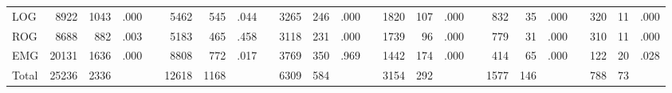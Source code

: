 \begin{SidewaysTable}
{\begin{tabular}{lrrrlrrrlrrrlrrrlrrrlrrr}
LOG   & 8922      & 1043    & .000    &  & 5462     & 545     & .044    &  & 3265     & 246    & .000    &  & 1820    & 107    & .000    &  & 832     & 35     & .000   &  & 320     & 11    & .000    \\
ROG   & 8688      & 882     & .003    &  & 5183     & 465     & .458    &  & 3118     & 231    & .000    &  & 1739    & 96     & .000    &  & 779     & 31     & .000   &  & 310     & 11    & .000    \\
EMG   & 20131     & 1636    & .000    &  & 8808     & 772     & .017    &  & 3769     & 350    & .969    &  & 1442    & 174    & .000    &  & 414     & 65     & .000   &  & 122     & 20    & .028    \\
Total & 25236     & 2336    &          &  & 12618    & 1168    &          &  & 6309     & 584    &          &  & 3154    & 292    &          &  & 1577    & 146    &         &  & 788     & 73    &          \\ \bottomrule
\end{tabular}
}
\end{SidewaysTable}


